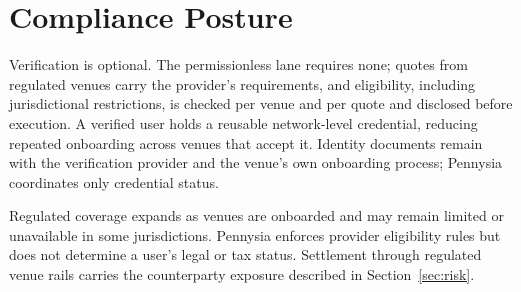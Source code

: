 \section{Compliance Posture}\label{sec:compliance}\label{sec:credential}

Verification is optional. The permissionless lane requires none; quotes from regulated venues carry the provider's requirements, and eligibility, including jurisdictional restrictions, is checked per venue and per quote and disclosed before execution. A verified user holds a reusable network-level credential, reducing repeated onboarding across venues that accept it. Identity documents remain with the verification provider and the venue's own onboarding process; Pennysia coordinates only credential status.

Regulated coverage expands as venues are onboarded and may remain limited or unavailable in some jurisdictions. Pennysia enforces provider eligibility rules but does not determine a user's legal or tax status. Settlement through regulated venue rails carries the counterparty exposure described in Section~\ref{sec:risk}.
